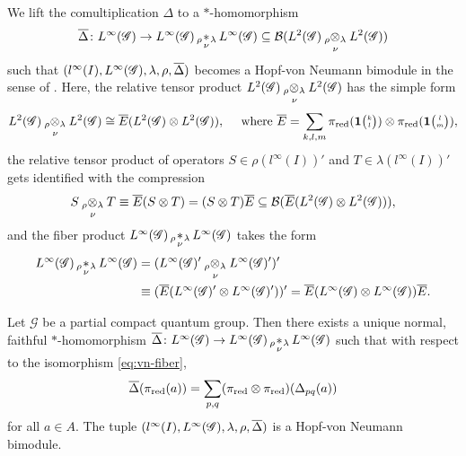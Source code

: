 We lift the comultiplication $\Delta$ to a $*$-homomorphism
\begin{align*}
  \vnDelta \colon \LGinf \to \LGinf  \astrl  \LGinf \subseteq {\cal B}(\LGtwo \otimesrl \LGtwo)
\end{align*}
such that $(l^{\infty}(I),\LGinf,\lambda,\rho,\vnDelta)$ becomes a Hopf-von Neumann bimodule in the sense of \cite{Val1}. 
Here, the relative tensor product $  \LGtwo \otimesrl \LGtwo$ has the simple form
\begin{align*}
  \LGtwo \otimesrl \LGtwo \cong
\overline{E}(\LGtwo \otimes \LGtwo), \quad \text{ where } 
  \overline{E} =  \sum_{k,l,m} \pi_{\red}(\UnitC{k}{l}) \otimes \pi_{\red}(\UnitC{l}{m}),
\end{align*}
the relative tensor product of operators $S\in \rho(l^{\infty}(I))'$
and $T \in \lambda(l^{\infty}(I))'$  gets identified with the
compression
\begin{align*}
S \otimesrl T \equiv
  \vnE(S \otimes
  T) = (S \otimes T)\vnE \subseteq {\cal B}(\vnE(\LGtwo
  \otimes \LGtwo)),
\end{align*}
and the fiber product $ \LGinf  \astrl  \LGinf$ takes the form
\begin{align} \label{eq:vn-fiber}
  \begin{aligned}
    \LGinf \astrl \LGinf &= (\LGinf' \otimesrl \LGinf')' \\ &\equiv
    (\vnE(\LGinf' \otimes \LGinf'))' = \vnE(\LGinf \otimes
    \LGinf)\vnE.
  \end{aligned}
\end{align} 
\begin{Prop}\label{prop:hopf-vn-bimodule}
  Let  $\mathscr{G}$ be a partial compact quantum group. Then there exists a unique normal, faithful $*$-homomorphism $\vnDelta \colon \LGinf \to \LGinf \astrl \LGinf$ such that with respect to the isomorphism \eqref{eq:vn-fiber}, 
  \begin{align*}
    \vnDelta(\pi_{\red}(a))  = \sum_{p,q} (\pi_{\red} \otimes \pi_{\red})(\Delta_{pq}(a))
  \end{align*}
for all $a\in A$. The tuple  $(l^{\infty}(I),\LGinf,\lambda,\rho,\vnDelta)$ is a Hopf-von Neumann bimodule.
\end{Prop}
